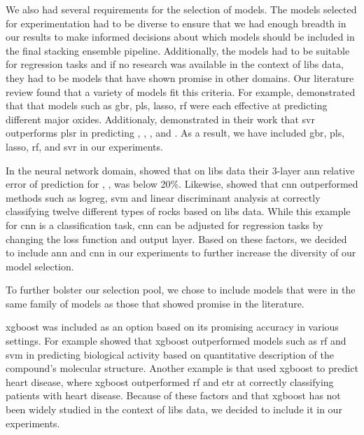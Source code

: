 We also had several requirements for the selection of models.
The models selected for experimentation had to be diverse to ensure that we had enough breadth in our results to make informed decisions about which models should be included in the final stacking ensemble pipeline.
Additionally, the models had to be suitable for regression tasks and if no research was available in the context of \gls{libs} data, they had to be models that have shown promise in other domains.
Our literature review found that a variety of models fit this criteria.
For example, \citet{andersonPostlandingMajorElement2022} demonstrated that that models such as \gls{gbr}, \gls{pls}, \gls{lasso}, \gls{rf} were each effective at predicting different major oxides.
Additionaly, \citet{svrforlibs} demonstrated in their work that \gls{svr} outperforms \gls{plsr} in predicting , , ,  and .
As a result, we have included \gls{gbr}, \gls{pls}, \gls{lasso}, \gls{rf}, and \gls{svr} in our experiments.

In the neural network domain, \cite{ann_libs_soil_analysis} showed that on \gls{libs} data their 3-layer \gls{ann} relative error of prediction for , ,  was below 20\%.
Likewise, \citet{yangConvolutionalNeuralNetwork2022} showed that \gls{cnn} outperformed methods such as \gls{logreg}, \gls{svm} and linear discriminant analysis at correctly classifying twelve different types of rocks based on \gls{libs} data. 
While this example for \gls{cnn} is a classification task, \gls{cnn} can be adjusted for regression tasks by changing the loss function and output layer.
Based on these factors, we decided to include \gls{ann} and \gls{cnn} in our experiments to further increase the diversity of our model selection.

To further bolster our selection pool, we chose to include models that were in the same family of models as those that showed promise in the literature.

\gls{xgboost} was included as an option based on its promising accuracy in various settings.
For example \citet{xgboost_in_biomedicie} showed that \gls{xgboost} outperformed models such as \gls{rf} and \gls{svm} in predicting biological activity based on quantitative description of the compound's molecular structure. 
Another example is \citet{xgboost_in_heart_disease} that used \gls{xgboost} to predict heart disease, where \gls{xgboost} outperformed \gls{rf} and \gls{etr} at correctly classifying patients with heart disease.
Because of these factors and that \gls{xgboost} has not been widely studied in the context of \gls{libs} data, we decided to include it in our experiments.

